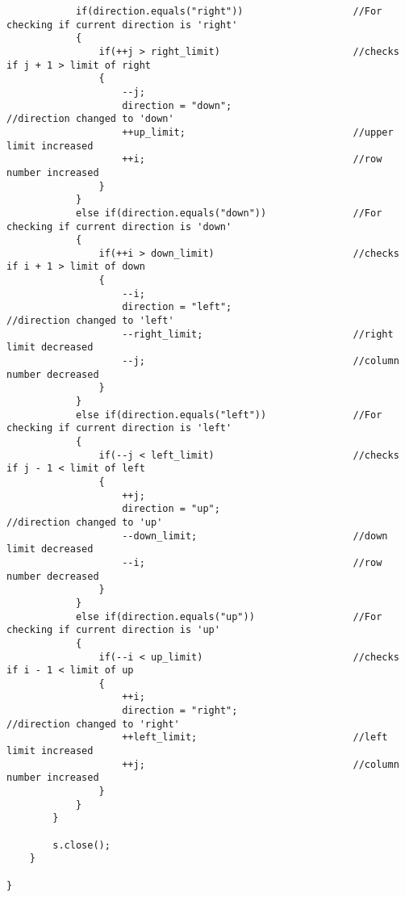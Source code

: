 \documentclass[ProgramminAssignment.tex]{subfiles}
\begin{document}
\begin{lstlisting}
			if(direction.equals("right"))					//For checking if current direction is 'right'
			{
				if(++j > right_limit)						//checks if j + 1 > limit of right
	            {
	                --j;
	                direction = "down";						//direction changed to 'down'
	                ++up_limit;								//upper limit increased
	                ++i;									//row number increased
	            }
			}
			else if(direction.equals("down")) 				//For checking if current direction is 'down'
			{
				if(++i > down_limit)						//checks if i + 1 > limit of down
	            {
	                --i;
	                direction = "left";						//direction changed to 'left'
	                --right_limit;							//right limit decreased
	                --j;									//column number decreased
	            }
			}
			else if(direction.equals("left"))				//For checking if current direction is 'left'
			{
				if(--j < left_limit)						//checks if j - 1 < limit of left
	            {
	                ++j;
	                direction = "up";						//direction changed to 'up'
	                --down_limit;							//down limit decreased
	                --i;									//row number decreased
	            }
			}
			else if(direction.equals("up"))					//For checking if current direction is 'up'
			{
				if(--i < up_limit)							//checks if i - 1 < limit of up
	            {
	                ++i;
	                direction = "right";					//direction changed to 'right'
	                ++left_limit;							//left limit increased
	                ++j;									//column number increased
	            }
			}
		}
		
		s.close();
	}

}

\end{lstlisting}
\end{document}
